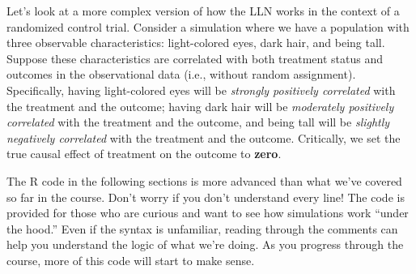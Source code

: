 \documentclass[
  letterpaper,
  DIV=11,
  numbers=noendperiod]{scrreprt}
\begin{document}
Let's look at a more complex version of how the LLN works in the context
of a randomized control trial. Consider a simulation where we have a
population with three observable characteristics: light-colored eyes,
dark hair, and being tall. Suppose these characteristics are correlated
with both treatment status and outcomes in the observational data (i.e.,
without random assignment). Specifically, having light-colored eyes will
be \emph{strongly positively correlated} with the treatment and the
outcome; having dark hair will be \emph{moderately positively
correlated} with the treatment and the outcome, and being tall will be
\emph{slightly negatively correlated} with the treatment and the
outcome. Critically, we set the true causal effect of treatment on the
outcome to \textbf{zero}.

\begin{tcolorbox}[enhanced jigsaw, arc=.35mm, bottomrule=.15mm, bottomtitle=1mm, breakable, colback=white, colbacktitle=quarto-callout-tip-color!10!white, colframe=quarto-callout-tip-color-frame, coltitle=black, left=2mm, leftrule=.75mm, opacityback=0, opacitybacktitle=0.6, rightrule=.15mm, title=\textcolor{quarto-callout-tip-color}{\faLightbulb}\hspace{0.5em}{A Note on the Code Below}, titlerule=0mm, toprule=.15mm, toptitle=1mm]

The R code in the following sections is more advanced than what we've
covered so far in the course. Don't worry if you don't understand every
line! The code is provided for those who are curious and want to see how
simulations work ``under the hood.'' Even if the syntax is unfamiliar,
reading through the comments can help you understand the logic of what
we're doing. As you progress through the course, more of this code will
start to make sense.

\end{tcolorbox}
\end{document}
